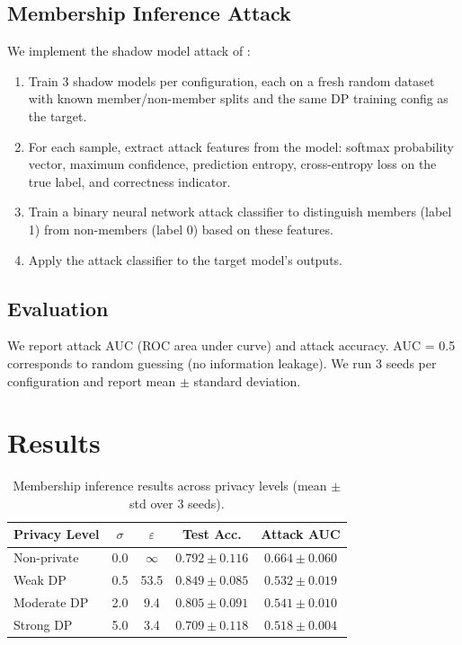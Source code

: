 \documentclass[11pt,a4paper]{article}
\begin{document}
\subsection{Membership Inference Attack}

We implement the shadow model attack of \citet{shokri2017membership}:
\begin{enumerate}
  \item Train 3 shadow models per configuration, each on a fresh random dataset with known member/non-member splits and the same DP training config as the target.
  \item For each sample, extract attack features from the model: softmax probability vector, maximum confidence, prediction entropy, cross-entropy loss on the true label, and correctness indicator.
  \item Train a binary neural network attack classifier to distinguish members (label 1) from non-members (label 0) based on these features.
  \item Apply the attack classifier to the target model's outputs.
\end{enumerate}

\subsection{Evaluation}

We report attack AUC (ROC area under curve) and attack accuracy. AUC = 0.5 corresponds to random guessing (no information leakage). We run 3 seeds per configuration and report mean $\pm$ standard deviation.

\section{Results}

\begin{table}[h]
\centering
\caption{Membership inference results across privacy levels (mean $\pm$ std over 3 seeds).}
\label{tab:results}
\begin{tabular}{lcccc}
\toprule
Privacy Level & $\sigma$ & $\varepsilon$ & Test Acc. & Attack AUC \\
\midrule
Non-private & 0.0 & $\infty$ & $0.792 \pm 0.116$ & $\mathbf{0.664 \pm 0.060}$ \\
Weak DP & 0.5 & 53.5 & $0.849 \pm 0.085$ & $0.532 \pm 0.019$ \\
Moderate DP & 2.0 & 9.4 & $0.805 \pm 0.091$ & $0.541 \pm 0.010$ \\
Strong DP & 5.0 & 3.4 & $0.709 \pm 0.118$ & $0.518 \pm 0.004$ \\
\bottomrule
\end{tabular}
\end{table}
\end{document}
